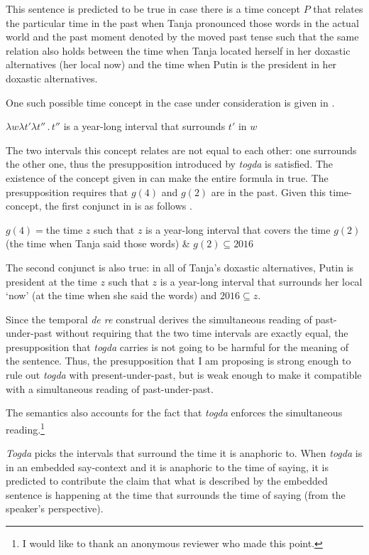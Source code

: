 \documentclass[output=paper,modfonts,newtxmath,hidelinks]{langscibook}
\begin{document}
\noindent This sentence is predicted to be true in case there is a time concept $P$ that relates the particular time in the past when Tanja pronounced those words in the actual world and the past moment denoted by the moved past tense such that the same relation also holds between the time when Tanja located herself in her doxastic alternatives (her local now) and the time when Putin is the president in her doxastic alternatives.

One such possible time concept in the case under consideration is given in .

\ea $\lambda w\lambda t'\lambda t''\,.\,t''$ is a year-long interval that surrounds $t'$ in $w$\label{20:ex41}
\z

\noindent The two intervals this concept relates are not equal to each other: one surrounds the other one, thus the presupposition introduced by \textit{togda} is satisfied. The existence of the concept given in  can make the entire formula in  true. The presupposition requires that $g(4)$ and $g(2)$ are in the past. Given this time-concept, the first conjunct in  is as follows .

\ea $g(4)={}$the time $z$ such that $z$ is a year-long interval that covers
\glt \hspace{0.5cm}the time $g(2)$ (the time when Tanja said those words) \& $g(2)\subseteq 2016$\label{20:ex42}
\z

\noindent The second conjunct is also true: in all of Tanja’s doxastic alternatives, Putin is president at the time $z$ such that $z$ is a year-long interval that surrounds her local `now' (at the time when she said the words) and $2016\subseteq z$.

Since the temporal \textit{de re} construal derives the simultaneous reading of past-under-past without requiring that the two time intervals are exactly equal, the presupposition that \textit{togda} carries is not going to be harmful for the meaning of the sentence. Thus, the presupposition that I am proposing is strong enough to rule out \textit{togda} with present-under-past, but is weak enough to make it compatible with a simultaneous reading of past-under-past.

The semantics  also accounts for the fact that \textit{togda} enforces the simultaneous reading.\footnote{\label{20:fn12}I would like to thank an anonymous reviewer who made this point.}

\textit{Togda} picks the intervals that surround the time it is anaphoric to. When \textit{togda} is in an embedded say-context and it is anaphoric to the time of saying, it is predicted to contribute the claim that what is described by the embedded sentence is happening at the time that surrounds the time of saying (from the speaker’s perspective).
\end{document}
